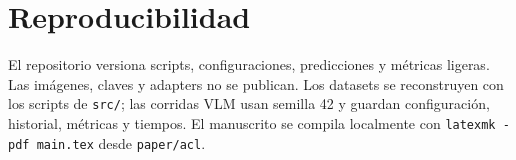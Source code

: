 \documentclass[11pt]{article}
\begin{document}
\section*{Reproducibilidad}

El repositorio versiona scripts, configuraciones, predicciones y métricas ligeras. Las imágenes, claves y adapters no se publican. Los datasets se reconstruyen con los scripts de \texttt{src/}; las corridas VLM usan semilla 42 y guardan configuración, historial, métricas y tiempos. El manuscrito se compila localmente con \texttt{latexmk -pdf main.tex} desde \texttt{paper/acl}.


\end{document}
